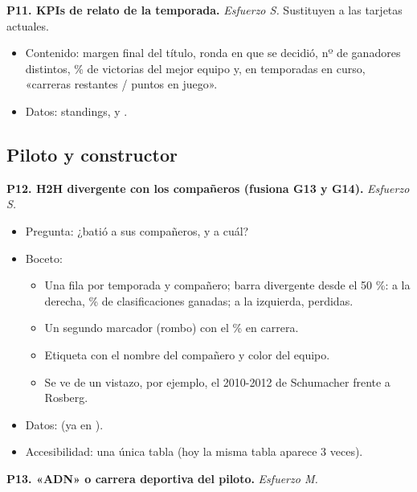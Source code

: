 \textbf{P11. KPIs de relato de la temporada.} \emph{Esfuerzo S.} Sustituyen a las tarjetas actuales.

\begin{itemize}
\item Contenido: margen final del título, ronda en que se decidió, nº de ganadores distintos, \% de victorias del mejor equipo y, en temporadas en curso, «carreras restantes / puntos en juego».
\item Datos: standings,  y .
\end{itemize}

\subsection{Piloto y constructor}

\textbf{P12. H2H divergente con los compañeros (fusiona G13 y G14).} \emph{Esfuerzo S.}

\begin{itemize}
\item Pregunta: ¿batió a sus compañeros, y a cuál?
\item Boceto:
\begin{itemize}
\item Una fila por temporada y compañero; barra divergente desde el 50 \%: a la derecha, \% de clasificaciones ganadas; a la izquierda, perdidas.
\item Un segundo marcador (rombo) con el \% en carrera.
\item Etiqueta con el nombre del compañero y color del equipo.
\item Se ve de un vistazo, por ejemplo, el 2010-2012 de Schumacher frente a Rosberg.
\end{itemize}
\item Datos:  (ya en ).
\item Accesibilidad: una única tabla (hoy la misma tabla aparece 3 veces).
\end{itemize}

\textbf{P13. «ADN» o carrera deportiva del piloto.} \emph{Esfuerzo M.}

